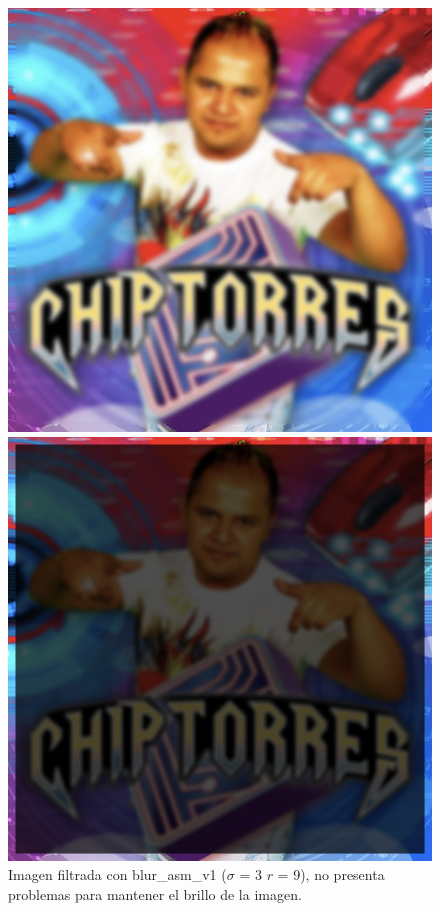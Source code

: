 \begin{figure}[H]
\centering
\begin{minipage}{0.48\textwidth}
  \centering
    \includegraphics[width=1\textwidth]{imgs/chip_hd_v1.jpg}
  \caption{\footnotesize{Imagen filtrada con blur\_asm\_v1 ($\sigma$ = 3 $r$ = 9), no presenta problemas para mantener el brillo de la imagen.}}
  \label{fig:tiempo1}
\end{minipage}%
\hspace{0.03\textwidth}
\begin{minipage}{0.48\textwidth}   
  \centering
    \includegraphics[width=1\textwidth]{imgs/chip_hd_ushort.jpg} 

\end{minipage}
\end{figure}
